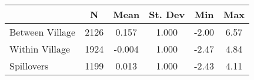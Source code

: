 \begin{tabular}{l*{5}{c}}\hline&\multicolumn{1}{c}{N}&\multicolumn{1}{c}{Mean}&\multicolumn{1}{c}{St. Dev}&\multicolumn{1}{c}{Min}&\multicolumn{1}{c}{Max}\\ \hline 
Between Village & 2126 & 0.157 & 1.000 & -2.00 & 6.57 \\
Within Village & 1924 & -0.004 & 1.000 & -2.47 & 4.84 \\
Spillovers & 1199 & 0.013 & 1.000 & -2.43 & 4.11 \\
\hline \end{tabular}
